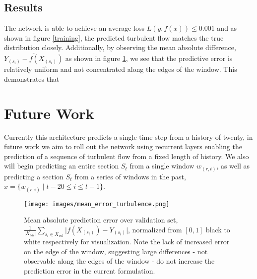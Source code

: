 \documentclass[10pt,letterpaper]{article}
\begin{document}
\subsection{Results}
 The network is able to achieve an average loss $L(y, f(x)) \leq 0.001$ and as shown in figure \ref{training}, the predicted turbulent flow matches the true distribution closely. Additionally, by observing the mean absolute difference, $\overline{Y_{(s_i)} - f(X_{(s_i)})}$ as shown in figure \ref{mean_error}, we see that the predictive error is relatively uniform and not concentrated along the edges of the window. This demonstrates that 





\section{Future Work}
Currently this architecture predicts a single time step from a history of twenty, in future work we aim to roll out the network using recurrent layers enabling the prediction of a sequence of turbulent flow from a fixed length of history. We also will begin predicting an entire section $S_t$ from a single window $w_(r,t)$, as well as predicting a section $S_t$ from a series of windows in the past, $x = \{w_{(r,i)} \mid t-20 \leq i \leq t-1 \}$. 

\begin{figure}
	\begin{center}
		\texttt{[image: images/mean\_error\_turbulence.png]}
		\caption{\small Mean absolute prediction error over validation set,  $ \frac{1}{\left\vert X_{val} \right\vert} \sum_{s_i \in X_{val}}^{} \vert f(X_{(s_i)}) -  Y_{(s_i)} \vert $, normalized from $[0, 1]$ black to white respectively for visualization. Note the lack of increased error on the edge of the window, suggesting large differences - not observable along the edges of the window - do not increase the prediction error in the current formulation.}
		\label{mean_error}
	\end{center}	
\end{figure}
\end{document}
